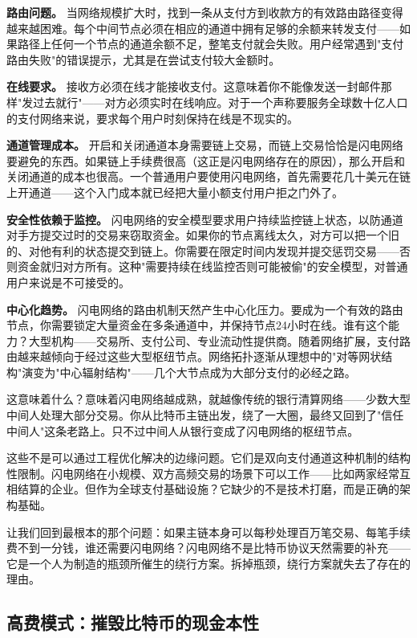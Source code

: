 \documentclass[a4paper,12pt,openany]{ctexbook}
\begin{document}
\textbf{路由问题。} 当网络规模扩大时，找到一条从支付方到收款方的有效路由路径变得越来越困难。每个中间节点必须在相应的通道中拥有足够的余额来转发支付——如果路径上任何一个节点的通道余额不足，整笔支付就会失败。用户经常遇到"支付路由失败"的错误提示，尤其是在尝试支付较大金额时。

\textbf{在线要求。} 接收方必须在线才能接收支付。这意味着你不能像发送一封邮件那样"发过去就行"——对方必须实时在线响应。对于一个声称要服务全球数十亿人口的支付网络来说，要求每个用户时刻保持在线是不现实的。

\textbf{通道管理成本。} 开启和关闭通道本身需要链上交易，而链上交易恰恰是闪电网络要避免的东西。如果链上手续费很高（这正是闪电网络存在的原因），那么开启和关闭通道的成本也很高。一个普通用户要使用闪电网络，首先需要花几十美元在链上开通道——这个入门成本就已经把大量小额支付用户拒之门外了。

\textbf{安全性依赖于监控。} 闪电网络的安全模型要求用户持续监控链上状态，以防通道对手方提交过时的交易来窃取资金。如果你的节点离线太久，对方可以把一个旧的、对他有利的状态提交到链上。你需要在限定时间内发现并提交惩罚交易——否则资金就归对方所有。这种"需要持续在线监控否则可能被偷"的安全模型，对普通用户来说是不可接受的。

\textbf{中心化趋势。} 闪电网络的路由机制天然产生中心化压力。要成为一个有效的路由节点，你需要锁定大量资金在多条通道中，并保持节点24小时在线。谁有这个能力？大型机构——交易所、支付公司、专业流动性提供商。随着网络扩展，支付路由越来越倾向于经过这些大型枢纽节点。网络拓扑逐渐从理想中的"对等网状结构"演变为"中心辐射结构"——几个大节点成为大部分支付的必经之路。

这意味着什么？意味着闪电网络越成熟，就越像传统的银行清算网络——少数大型中间人处理大部分交易。你从比特币主链出发，绕了一大圈，最终又回到了"信任中间人"这条老路上。只不过中间人从银行变成了闪电网络的枢纽节点。

这些不是可以通过工程优化解决的边缘问题。它们是双向支付通道这种机制的结构性限制。闪电网络在小规模、双方高频交易的场景下可以工作——比如两家经常互相结算的企业。但作为全球支付基础设施？它缺少的不是技术打磨，而是正确的架构基础。

让我们回到最根本的那个问题：如果主链本身可以每秒处理百万笔交易、每笔手续费不到一分钱，谁还需要闪电网络？闪电网络不是比特币协议天然需要的补充——它是一个人为制造的瓶颈所催生的绕行方案。拆掉瓶颈，绕行方案就失去了存在的理由。


\subsection*{高费模式：摧毁比特币的现金本性}
\end{document}
